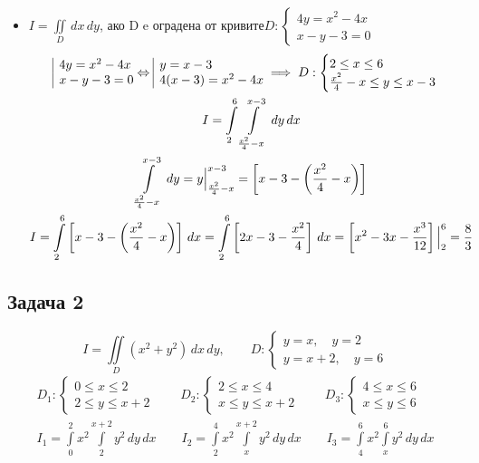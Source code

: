 \documentclass[a4paper,fleqn,12pt]{article}
\theoremstyle{definition}
\begin{document}
\begin{itemize}
\item $I = \iint\limits _D \,dx \,dy$, ако D e оградена от кривите$D: \begin{cases} 4y = x^2 - 4x \\ x - y - 3 = 0 \end{cases}$
\begin{gather*}
\begin{array}{|l@{}}
4y = x^2 - 4x \\ 
x - y - 3 = 0
\end{array} \Leftrightarrow
\begin{array}{|l@{}}
y = x - 3 \\
4(x-3) = x^2 - 4x
\end{array}\implies D: \begin{cases} 
2 \leq x \leq 6 \\
\frac{x^2}{4}- x \leq y \leq x - 3 
\end{cases}\\
I = \int\limits_2 ^6 \int\limits_{\frac{x^2}{4} - x} ^{x - 3} \, dy \,dx  \\
\int\limits_{\frac{x^2}{4} - x} ^{x - 3} \, dy  = y \Big|_{\frac{x^2}{4} - x} ^{x - 3} = \left[ x- 3 - \left( \frac{x^2}{4} - x\right) \right] \\
I = \int\limits_2 ^6 \left[ x- 3 - \left( \frac{x^2}{4} - x\right) \right] \, dx = \int\limits_2 ^6 \left[ 2x- 3 - \frac{x^2}{4} \right] \, dx = \left[ x^2- 3x - \frac{x^3}{12} \right] \Big|_2 ^6 = \frac{8}{3}
\end{gather*}

\end{itemize}
\subsection*{Задача 2}
$$I = \iint\limits_D (x^2 + y^2) \, dx \, dy, \qquad D: \begin{cases} y = x , \quad y =2 \\ y = x + 2, \quad y = 6 \end{cases}$$
\begin{gather*}
D_1: \begin{cases} 
0\leq x \leq 2 \\
2 \leq y \leq x +2
\end{cases} \qquad 
D_2: \begin{cases} 
2\leq x \leq 4 \\
x \leq y \leq x +2
\end{cases} \qquad 
D_3: \begin{cases} 
4\leq x \leq 6 \\
x \leq y \leq 6
\end{cases} \\
I_1 = \int\limits_0 ^2 x^2 \int\limits_{2} ^{x+2} y^2\, dy \, dx  \qquad
I_2 = \int\limits_2 ^4 x^2 \int\limits_{x} ^{x+2} y^2 \, dy\, dx  \qquad  
I_3 = \int\limits_4 ^6 x^2 \int\limits_{x} ^{6} y^2\, dy \, dx 
\end{gather*}
\end{document}
